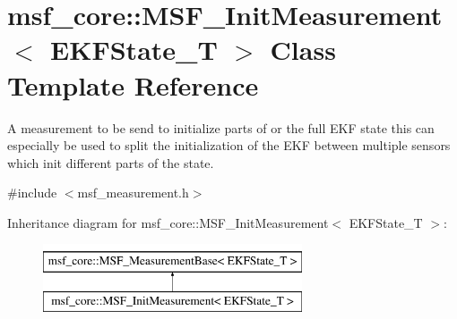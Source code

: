 \hypertarget{classmsf__core_1_1MSF__InitMeasurement}{\section{msf\-\_\-core\-:\-:M\-S\-F\-\_\-\-Init\-Measurement$<$ E\-K\-F\-State\-\_\-\-T $>$ Class Template Reference}
\label{classmsf__core_1_1MSF__InitMeasurement}
}


A measurement to be send to initialize parts of or the full E\-K\-F state this can especially be used to split the initialization of the E\-K\-F between multiple sensors which init different parts of the state.  




{\ttfamily \#include $<$msf\-\_\-measurement.\-h$>$}

Inheritance diagram for msf\-\_\-core\-:\-:M\-S\-F\-\_\-\-Init\-Measurement$<$ E\-K\-F\-State\-\_\-\-T $>$\-:\begin{figure}[H]
\begin{center}
\leavevmode
\includegraphics[height=2.000000cm]{classmsf__core_1_1MSF__InitMeasurement}
\end{center}
\end{figure}
